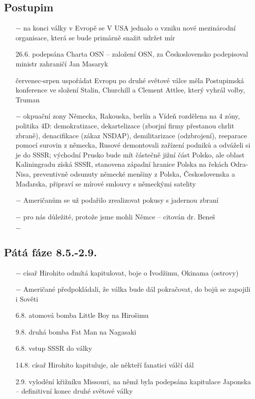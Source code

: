 \documentclass{article}
\begin{document}
\subsection*{Postupim}
\begin{itemize}
    \vspace{-0.5em}
    \setlength\itemsep{0.15em}
    \item[$-$] na konci války v Evropě se V USA jednalo o vzniku nové mezinárodní organisace, která se bude primárně snažit udržet mír
    \item[26.6.] podepsána Charta OSN -- založení OSN, za Československo podepisoval ministr zahraničí Jan Masaryk
    \item[červenec-srpen] uspořádat Evropu po druhé světové válce měla Postupimská konference ve složení Stalin, Churchill a Clement Attlee, který vyhrál volby, Truman
    \item[$-$] okpuační zony Německa, Rakouska, berlín a Vídeň rozdělena na 4 zóny, politika 4D: demokratizace, dekartelizace (zborjní firmy přestanou chrlit zbraně), denacifikace (zákaz NSDAP), demilitarizace (odzbrojení), reeparace pomocí surovin z německa, Rusové demontovali zařízení podniků a odváželi si je do SSSR; východní Prusko bude mít částečně jižní část Polsko, ale oblast Kaliningradu získá SSSR, stanovena západní hranice Polska na řekách Odra-Nisa, preventivně odsunuty německé menšiny z Polska, Československa a Maďarska, připraví se mírové smlouvy s německými satelity
    \item[$-$] Američanům se už podařilo zrealizovat pokusy s jadernou zbraní
    \item[$-$] pro nás důležité, protože jsme mohli  Němce -- citován dr. Beneš
    \item[$-$]
\end{itemize}

\subsection*{Pátá fáze 8.5.-2.9.}
\begin{itemize}
    \vspace{-0.5em}
    \setlength\itemsep{0.15em}
    \item[$-$] císař Hirohito odmítá kapitulovat, boje o Ivodžimu, Okinama (ostrovy)
    \item[$-$] Američané předpokládali, že válka bude dál pokračovat, do bojů se zapojili i Sověti
    \item[6.8.] atomová bomba Little Boy na Hirošimu
    \item[9.8.] druhá bomba Fat Man na Nagasaki
    \item[6.8.] vstup SSSR do války
    \item[14.8.] císař Hirohito kapituluje, ale někteří fanatici válčí dál
    \item[2.9.] vylodění křižníku Missouri, na němž byla podepsána kapitulace Japonska -- definitivní konec druhé světové války   
\end{itemize}
\end{document}
